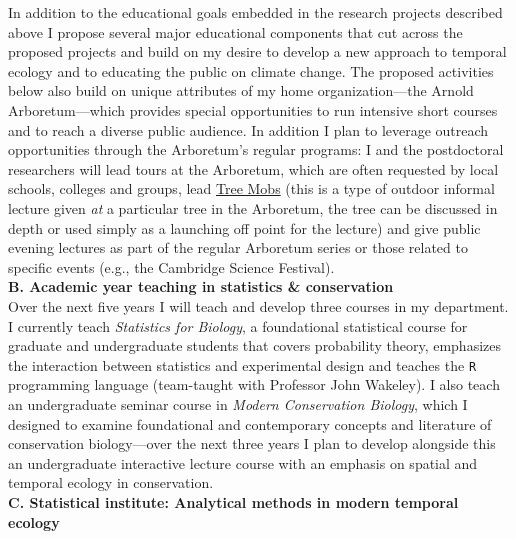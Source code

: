 \documentclass[12pt,a4paper,oneside]{article}
\begin{document}
In addition to the educational goals embedded in the research projects described above I propose several major educational components that cut across the proposed projects and build on my desire to develop a new approach to temporal ecology and to educating the public on climate change. The proposed activities below also build on unique attributes of my home organization---the Arnold Arboretum---which provides special opportunities to run intensive short courses and to reach a diverse public audience. In addition I plan to leverage outreach opportunities through the Arboretum's regular programs: I and the postdoctoral researchers will lead tours at the Arboretum, which are often requested by local schools, colleges and groups, lead \href{http://arboretum.harvard.edu/visit/tree-mob/}{Tree Mobs} (this is a type of outdoor informal lecture given \emph{at} a particular tree in the Arboretum, the tree can be discussed in depth or used simply as a launching off point for the lecture) and give public evening lectures as part of the regular Arboretum series or those related to specific events (e.g., the Cambridge Science Festival). 
\vspace{1.5ex}\\
{\bf B. Academic year teaching in statistics \& conservation}
\vspace{1.5ex}\\
Over the next five years I will teach and develop three courses in my department. I currently teach \emph{Statistics for Biology}, a foundational statistical course for graduate and undergraduate students that covers probability theory, emphasizes the interaction between statistics and experimental design and teaches the \verb|R| programming language (team-taught with Professor John Wakeley). I also teach an undergraduate seminar course in \emph{Modern Conservation Biology}, which I designed to examine foundational and contemporary concepts and literature of conservation biology---over the next three years I plan to develop alongside this an undergraduate interactive lecture course with an emphasis on spatial and temporal ecology in conservation. %
\vspace{1.5ex}\\
{\bf C. Statistical institute: Analytical methods in modern temporal ecology}
\vspace{1.5ex}\\
\end{document}
